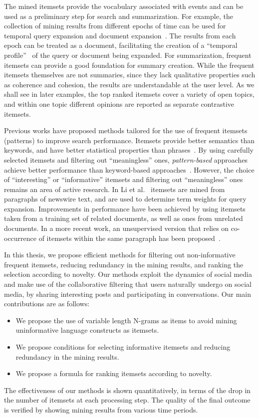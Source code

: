 \documentclass[letterpaper,12pt,titlepage,oneside,final]{book}
\begin{document}
The mined itemsets provide the vocabulary associated with events and can be
used as a preliminary step for search and summarization.
For example, the collection of mining results from different epochs of time
can be used for temporal 
query expansion and document expansion~\cite{choi2012temporal, efron2012improving}.
The results from each epoch can be treated as a document, facilitating the
creation of a ``temporal profile''~\cite{jones2007temporal} of the query
or document being expanded.
For summarization, frequent itemsets can provide a good foundation for summary
creation.
While the frequent itemsets themselves are not summaries, since they lack
qualitative properties such as coherence and cohesion, the results are
understandable at the user level.
As we shall see in later examples, the top ranked itemsets cover a variety
of open topics, and within one topic different opinions are reported as
separate contrastive itemsets.

Previous works have proposed methods tailored for the use of frequent itemsets (patterns) to improve search performance.  
Itemsets provide better semantics than keywords, and have better statistical properties than phrases~\cite{wu2006deploying}.
By using carefully selected itemsets and filtering out ``meaningless'' ones, 
\emph{pattern-based} approaches achieve better performance
than keyword-based approaches~\cite{wu2004automatic}. %
However, the choice of ``interesting'' or ``informative'' itemsets 
and filtering out ``meaningless'' ones remains an area of active research.
In Li et al.~\cite{li2010mining} itemsets are mined from
paragraphs of newswire text, and are used to determine term weights for query
expansion.
Improvements in performance have been achieved by using itemsets taken from
a training set of related documents, as well as ones from unrelated documents.
In a more recent work, an unsupervised version that relies on co-occurrence of 
itemsets within the same paragraph has been proposed~\cite{albathan2012using}.

In this thesis, we propose efficient methods for filtering out non-informative frequent itemsets,
reducing redundancy in the mining results, and ranking the selection according to novelty.
Our methods exploit the dynamics of social media and make use of the collaborative filtering
that users naturally undergo on social media, 
by sharing interesting posts and participating in conversations.
Our main contributions are as follows:
\begin{itemize}
\item We propose the use of variable length N-grams as items to avoid mining uninformative language constructs as itemsets. 
\item We propose conditions for selecting informative itemsets and reducing redundancy in the mining results.
\item We propose a formula for ranking itemsets according to novelty.
\end{itemize}
The effectiveness of our methods is shown quantitatively, 
in terms of the drop in the number of itemsets at each processing step. 
The quality of the final outcome is verified by showing mining results from various time periods.
\end{document}
